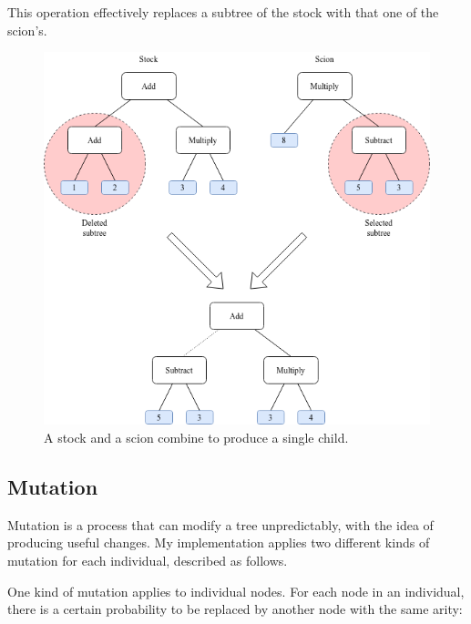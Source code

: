 \documentclass{report}
\begin{document}
This operation effectively replaces a subtree of the stock with that one of the scion's.

\begin{figure}[H]
    \centering
    \includegraphics[scale=0.60]{crossover}
    \caption{A stock and a scion combine to produce a single child.}
\end{figure}

\subsection{Mutation}

Mutation is a process that can modify a tree unpredictably, with the idea of producing useful changes. My implementation applies two different kinds of mutation for each individual, described as follows.

One kind of mutation applies to individual nodes. For each node in an individual, there is a certain probability to be replaced by another node with the same arity:
\end{document}

